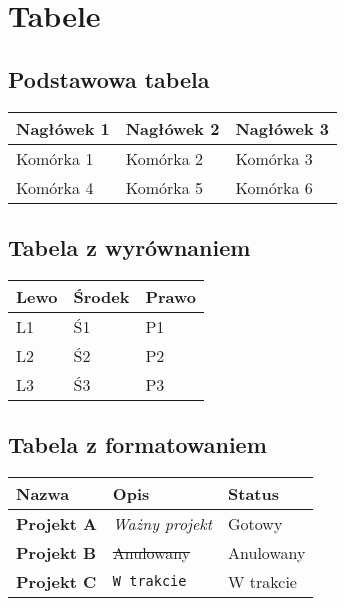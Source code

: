 \documentclass{article}
\begin{document}
\section{Tabele}



\subsection{Podstawowa tabela}



\begin{tabular}{|l|l|l|}
\toprule
\textbf{Nagłówek 1} & \textbf{Nagłówek 2} & \textbf{Nagłówek 3} \\
\midrule
Komórka 1 & Komórka 2 & Komórka 3 \\
Komórka 4 & Komórka 5 & Komórka 6 \\
\bottomrule
\end{tabular}



\subsection{Tabela z wyrównaniem}



\begin{tabular}{|l|l|l|}
\toprule
\textbf{Lewo} & \textbf{Środek} & \textbf{Prawo} \\
\midrule
L1 & Ś1 & P1 \\
L2 & Ś2 & P2 \\
L3 & Ś3 & P3 \\
\bottomrule
\end{tabular}



\subsection{Tabela z formatowaniem}



\begin{tabular}{|l|l|l|}
\toprule
\textbf{Nazwa} & \textbf{Opis} & \textbf{Status} \\
\midrule
\textbf{Projekt A} & \textit{Ważny projekt} & Gotowy \\
\textbf{Projekt B} & \sout{Anulowany} & Anulowany \\
\textbf{Projekt C} & \texttt{W trakcie} & W trakcie \\
\bottomrule
\end{tabular}
\end{document}
